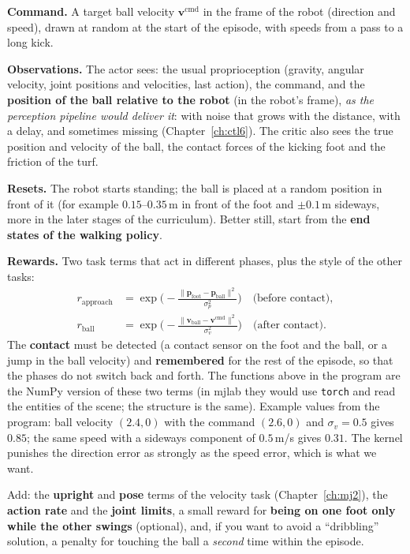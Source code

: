 \textbf{Command.} A target ball velocity $\mathbf v^{\text{cmd}}$ in the frame of the robot (direction and speed), drawn at random at the start of the episode, with speeds from a pass to a long kick.

\textbf{Observations.} The actor sees: the usual proprioception (gravity, angular velocity, joint positions and velocities, last action), the command, and the \textbf{position of the ball relative to the robot} (in the robot's frame), \emph{as the perception pipeline would deliver it}: with noise that grows with the distance, with a delay, and sometimes missing (Chapter~\ref{ch:ctl6}). The critic also sees the true position and velocity of the ball, the contact forces of the kicking foot and the friction of the turf.

\textbf{Resets.} The robot starts standing; the ball is placed at a random position in front of it (for example $0.15$--$0.35$\,m in front of the foot and $\pm0.1$\,m sideways, more in the later stages of the curriculum). Better still, start from the \textbf{end states of the walking policy}.

\textbf{Rewards.} Two task terms that act in different phases, plus the style of the other tasks:
\begin{align*}
r_{\text{approach}}&=\exp\!\Big(-\frac{\|\mathbf p_{\text{foot}}-\mathbf p_{\text{ball}}\|^2}{\sigma_p^2}\Big)\quad\text{(before contact)},\\
r_{\text{ball}}&=\exp\!\Big(-\frac{\|\mathbf v_{\text{ball}}-\mathbf v^{\text{cmd}}\|^2}{\sigma_v^2}\Big)\quad\text{(after contact)}.
\end{align*}
The \textbf{contact} must be detected (a contact sensor on the foot and the ball, or a jump in the ball velocity) and \textbf{remembered} for the rest of the episode, so that the phases do not switch back and forth. The functions above in the program are the NumPy version of these two terms (in mjlab they would use \verb!torch! and read the entities of the scene; the structure is the same). Example values from the program: ball velocity $(2.4,0)$ with the command $(2.6,0)$ and $\sigma_v=0.5$ gives $0.85$; the same speed with a sideways component of $0.5$\,m/s gives $0.31$. The kernel punishes the direction error as strongly as the speed error, which is what we want.

Add: the \textbf{upright} and \textbf{pose} terms of the velocity task (Chapter~\ref{ch:mj2}), the \textbf{action rate} and the \textbf{joint limits}, a small reward for \textbf{being on one foot only while the other swings} (optional), and, if you want to avoid a ``dribbling'' solution, a penalty for touching the ball a \emph{second} time within the episode.

